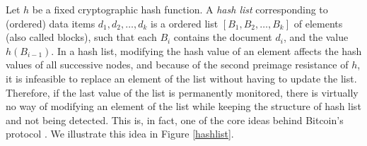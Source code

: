 
\medskip
{} 
Let $h$ be a fixed cryptographic hash function. A {\em hash list} corresponding to (ordered) data items $d_1,d_2,\dots, d_k$ is a ordered list $[B_1,B_2,\ldots ,B_k]$ of elements (also called blocks), such that each $B_i$ contains the document $d_i$, and the value $h(B_{i-1})$. In a hash list, modifying the hash value of an element affects the hash values of all successive nodes, and because of the second preimage resistance of $h$, it is infeasible to replace an element of the list without having to update the list. Therefore, if the last value of the list is permanently monitored, there is virtually no way of modifying an element of the list while keeping the structure of hash list and not being detected. This is, in fact, one of the core ideas behind Bitcoin's protocol \cite{whitepaper}. We illustrate this idea in Figure \ref{hashlist}.



